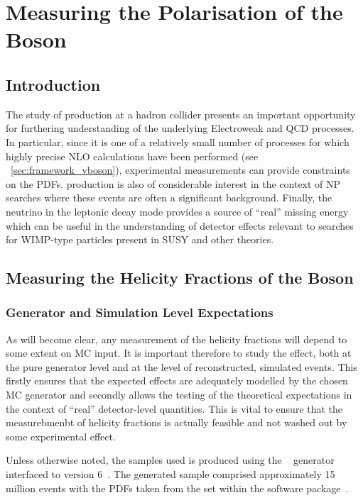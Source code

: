 \chapter{Measuring the Polarisation of the \texorpdfstring{\PW}{W} Boson}
\label{sec:wpol}
\section{Introduction}
The study of \Wjets production at a hadron collider presents an important
opportunity for furthering understanding of the underlying Electroweak and
\ac{QCD} processes. In particular, since it is one of a relatively small number
of processes for which highly precise \ac{NLO} calculations have been performed
(see \sec~\ref{sec:framework_vboson}), experimental measurements can provide
constraints on the \acp{PDF}. \Wjets production is also of considerable interest
in the context of \ac{NP} searches where these events are often a significant
background. Finally, the neutrino in the leptonic decay mode provides a source
of ``real'' missing energy which can be useful in the understanding of detector
effects relevant to searches for \acs{WIMP}-type particles present in \ac{SUSY}
and other theories.

\section{Measuring the Helicity Fractions of the \texorpdfstring{\PW}{W} Boson}
\subsection{Generator and Simulation Level Expectations}
As will become clear, any measurement of the helicity fractions will depend to
some extent on \acl{MC} input. It is important therefore to study the effect,
both at the pure generator level and at the level of reconstructed, simulated
events. This firstly ensures that the expected effects are adequately modelled
by the chosen \ac{MC} generator and secondly allows the testing of the
theoretical expectations in the context of ``real'' detector-level
quantities. This is vital to ensure that the measurebmenbt of helicity fractions
is actually feasible and not washed out by some experimental effect.

Unless otherwise noted, the \Wjets samples used is produced using the
\madgraph~\cite{madgraph} generator interfaced to \pythia version
6~\cite{pythia}. The generated sample comprised approximately 15 million events
with the \acp{PDF} taken from the \cteqsixlone set within the \lhapdf software
package~\cite{lhapdf, lhapdf_web}.

